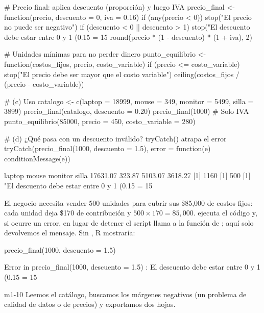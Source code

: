 \begin{rcode}
# Precio final: aplica descuento (proporción) y luego IVA
precio_final <- function(precio, descuento = 0, iva = 0.16) {
  if (any(precio < 0)) stop("El precio no puede ser negativo")
  if (descuento < 0 || descuento > 1) {
    stop("El descuento debe estar entre 0 y 1 (0.15 = 15%
  }
  round(precio * (1 - descuento) * (1 + iva), 2)
}

# Unidades mínimas para no perder dinero
punto_equilibrio <- function(costos_fijos, precio, costo_variable) {
  if (precio <= costo_variable) {
    stop("El precio debe ser mayor que el costo variable")
  }
  ceiling(costos_fijos / (precio - costo_variable))
}

# (c) Uso
catalogo <- c(laptop = 18999, mouse = 349, monitor = 5499, silla = 3899)
precio_final(catalogo, descuento = 0.20)
precio_final(1000)                          # Solo IVA
punto_equilibrio(85000, precio = 450, costo_variable = 280)

# (d) ¿Qué pasa con un descuento inválido? tryCatch() atrapa el error
tryCatch(precio_final(1000, descuento = 1.5),
         error = function(e) conditionMessage(e))
\end{rcode}
\begin{rsalida}
  laptop    mouse  monitor    silla 
17631.07   323.87  5103.07  3618.27 
[1] 1160
[1] 500
[1] "El descuento debe estar entre 0 y 1 (0.15 = 15%
\end{rsalida}

El negocio necesita vender 500 unidades para cubrir sus \$85,000 de costos
fijos: cada unidad deja \$170 de contribución y $500 \times 170 = 85{,}000$.  ejecuta el código y,
si ocurre un error, en lugar de detener el script llama a la función de
; aquí solo devolvemos el mensaje. Sin ,
R mostraría:

\begin{rnoejecutar}
precio_final(1000, descuento = 1.5)
\end{rnoejecutar}
\begin{rsalida}
Error in precio_final(1000, descuento = 1.5) :
  El descuento debe estar entre 0 y 1 (0.15 = 15%
\end{rsalida}


\begin{solucion}{m1-10}
Leemos el catálogo, buscamos los márgenes negativos (un problema de calidad
de datos o de precios) y exportamos dos hojas.
\end{solucion}

